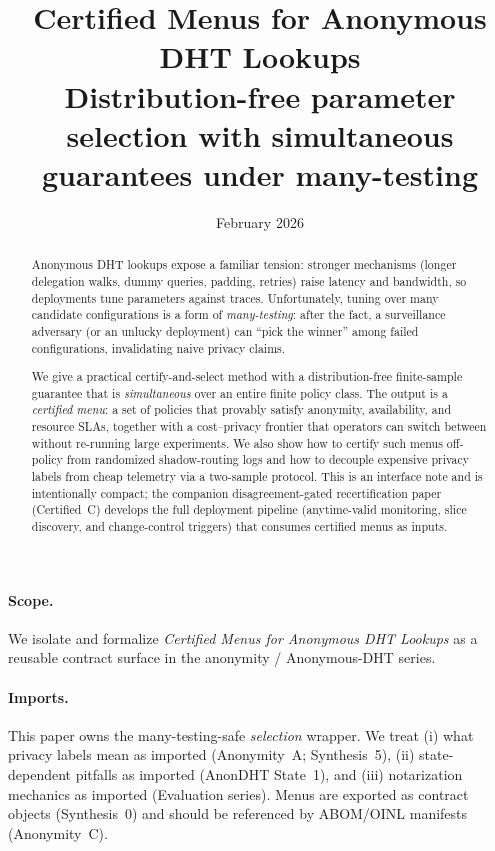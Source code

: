 \documentclass[11pt]{article}
\title{Certified Menus for Anonymous DHT Lookups\\
\large Distribution-free parameter selection with simultaneous guarantees under many-testing}
\author{}
\date{February 2026}
\begin{document}
\maketitle

\begin{abstract}
Anonymous DHT lookups expose a familiar tension: stronger mechanisms (longer delegation walks, dummy queries, padding, retries) raise latency and bandwidth, so deployments tune parameters against traces.
Unfortunately, tuning over many candidate configurations is a form of \emph{many-testing}: after the fact, a surveillance adversary (or an unlucky deployment) can ``pick the winner'' among failed configurations, invalidating naive privacy claims.

We give a practical certify-and-select method with a distribution-free finite-sample guarantee that is \emph{simultaneous} over an entire finite policy class.
The output is a \emph{certified menu}: a set of policies that provably satisfy anonymity, availability, and resource SLAs, together with a cost--privacy frontier that operators can switch between without re-running large experiments.
We also show how to certify such menus off-policy from randomized shadow-routing logs and how to decouple expensive privacy labels from cheap telemetry via a two-sample protocol.
This is an interface note and is intentionally compact; the companion disagreement-gated recertification paper (Certified~C) develops the full deployment pipeline (anytime-valid monitoring, slice discovery, and change-control triggers) that consumes certified menus as inputs.
\end{abstract}

\paragraph{Scope.}
We isolate and formalize \emph{Certified Menus for Anonymous DHT Lookups} as a reusable contract surface in the anonymity / Anonymous-DHT series.

\paragraph{Imports.}
This paper owns the many-testing-safe \emph{selection} wrapper.
We treat (i) what privacy labels mean as imported (Anonymity~A; Synthesis~5),\cite{series:oddsinflation,series:endpointbridge}
(ii) state-dependent pitfalls as imported (AnonDHT State~1),\cite{series:state1}
and (iii) notarization mechanics as imported (Evaluation series).
Menus are exported as contract objects (Synthesis~0) and should be referenced by ABOM/OINL manifests (Anonymity~C).\cite{series:contractobjects,series:abomoinl}
\end{document}
